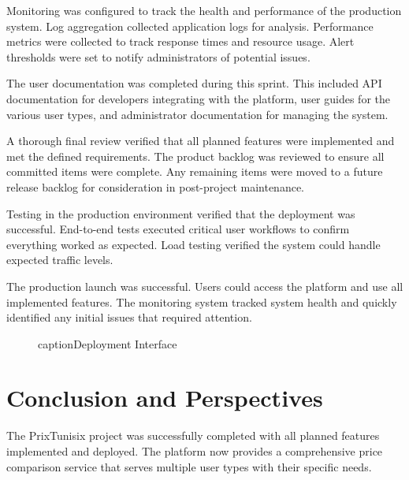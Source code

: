Monitoring was configured to track the health and performance
of the production system. Log aggregation collected application
logs for analysis. Performance metrics were collected to track
response times and resource usage. Alert thresholds were set
to notify administrators of potential issues.

The user documentation was completed during this sprint. This
included API documentation for developers integrating with
the platform, user guides for the various user types, and
administrator documentation for managing the system.

A thorough final review verified that all planned features
were implemented and met the defined requirements. The product
backlog was reviewed to ensure all committed items were
complete. Any remaining items were moved to a future release
backlog for consideration in post-project maintenance.

Testing in the production environment verified that the
deployment was successful. End-to-end tests executed critical
user workflows to confirm everything worked as expected.
Load testing verified the system could handle expected
traffic levels.

The production launch was successful. Users could access
the platform and use all implemented features. The monitoring
system tracked system health and quickly identified any
initial issues that required attention.

\begin{figure}[H]
\begin{center}
\end{center}
caption{Deployment Interface}
\label{fig:deployment_interface}
\end{figure}

\section*{Conclusion and Perspectives}

The PrixTunisix project was successfully completed with all
planned features implemented and deployed. The platform now
provides a comprehensive price comparison service that serves
multiple user types with their specific needs.

